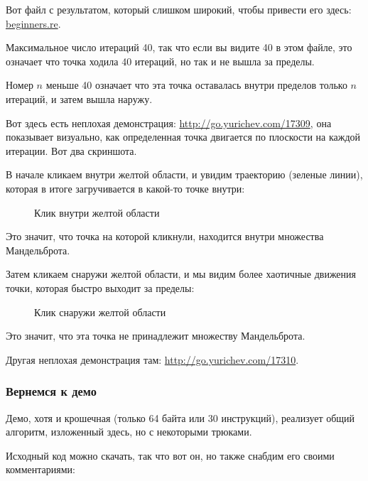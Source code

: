 

Вот файл с результатом, который слишком широкий, чтобы привести его здесь: \\
\href{http://go.yurichev.com/17164}{beginners.re}.

Максимальное число итераций 40, так что если вы видите 40 в этом файле, это означает что точка ходила
40 итераций, но так и не вышла за пределы.
 
Номер $n$ меньше 40 означает что эта точка оставалась внутри пределов только $n$ итераций, и затем
вышла наружу.


\clearpage
Вот здесь есть неплохая демонстрация: 
\url{http://go.yurichev.com/17309}, она показывает визуально,
как определенная точка двигается по плоскости на каждой итерации. 
Вот два скриншота.

В начале кликаем внутри желтой области, и увидим траекторию (зеленые линии), которая в итоге
загручивается в какой-то точке внутри:%


\begin{figure}[H]
\centering
{}
\caption{Клик внутри желтой области}
\end{figure}

Это значит, что точка на которой кликнули, находится внутри множества Мандельброта.


\clearpage
Затем кликаем снаружи желтой области, и мы видим более хаотичные движения точки, которая быстро выходит
за пределы:


\begin{figure}[H]
\centering
{}
\caption{Клик снаружи желтой области}
\end{figure}

Это значит, что эта точка не принадлежит множеству Мандельброта.

Другая неплохая демонстрация там: 
\url{http://go.yurichev.com/17310}.

\clearpage
\subsubsection{Вернемся к демо}

Демо, хотя и крошечная (только 64 байта или 30 инструкций), реализует общий алгоритм, изложенный
здесь, но с некоторыми трюками.


Исходный код можно скачать, так что вот он, но также снабдим его своими комментариями:


